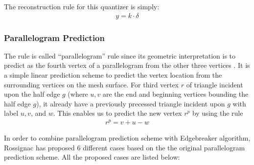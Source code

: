 \documentclass[onecolumn, 12pt]{article}
\begin{document}
The reconstruction rule for this quantizer is simply:
\begin{align}\label{eq:reconstruct}
y = k\cdot \delta
\end{align}


\subsubsection{Parallelogram Prediction}
The rule is called ``parallelogram'' rule since its geometric interpretation is to predict as the fourth vertex of a parallelogram from the other three vertices \cite{Parallel}. It is a simple linear prediction scheme to predict the vertex location from the surrounding vertices on the mesh surface. For third vertex $r$ of triangle incident upon the half edge $g$ (where $u, v$ are the end and beginning vertices bounding the half edge $g$), it already have a previously precessed triangle incident upon $g$ with label $u, v$, and $w$. This enables us to predict the new vertex $r^p$ by using the rule
\begin{align}\label{eq:parallelRule}
r^p = v + u - w
\end{align}

In order to combine parallelogram prediction scheme with Edgebreaker algorithm, Rossignac has proposed 6 different cases \cite{predictScheme} based on the the original parallelogram prediction scheme. All the proposed cases are listed below:
\end{document}
